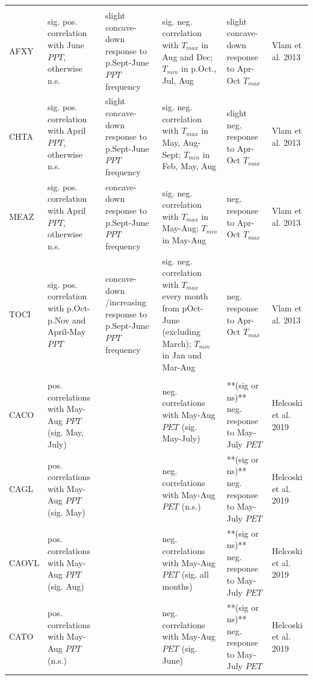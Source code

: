 \documentclass[
]{article}
\begin{document}
\begin{longtable}{l>{\raggedright\arraybackslash}p{2.5cm}>{\raggedright\arraybackslash}p{2.5cm}>{\raggedright\arraybackslash}p{2.5cm}>{\raggedright\arraybackslash}p{2.5cm}>{\raggedright\arraybackslash}p{2cm}}
\addlinespace[1em]
\multicolumn{4}{l}{\textbf{Huai Kha Khaeng, Thailand}}\\
\hspace{1em}AFXY & sig. pos. correlation with June $PPT$, otherwise n.s. & slight concave-down response to p.Sept-June $PPT$ frequency & sig. neg. correlation with $T_{max}$ in Aug and Dec; $T_{min}$ in p.Oct., Jul, Aug & slight concave-down response to Apr-Oct $T_{max}$ & Vlam et al. 2013\\
\hspace{1em}CHTA & sig. pos. correlation with April $PPT$, otherwise n.s. & slight concave-down response to p.Sept-June $PPT$ frequency & sig. neg. correlation with $T_{max}$ in May, Aug-Sept; $T_{min}$ in Feb, May, Aug & slight neg. response to Apr-Oct $T_{max}$ & Vlam et al. 2013\\
\hspace{1em}MEAZ & sig. pos. correlation with April $PPT$, otherwise n.s. & concave-down response to p.Sept-June $PPT$ frequency & sig. neg. correlation with $T_{max}$ in May-Aug; $T_{min}$ in May-Aug & neg. response to Apr-Oct $T_{max}$ & Vlam et al. 2013\\
\hspace{1em}TOCI & sig. pos. correlation with p.Oct-p.Nov and April-May $PPT$ & concave-down /increasing response to p.Sept-June $PPT$ frequency & sig. neg. correlation with $T_{max}$ every month from pOct-June (excluding March); $T_{min}$ in Jan and Mar-Aug & neg. response to Apr-Oct $T_{max}$ & Vlam et al. 2013\\
\addlinespace[1em]
\multicolumn{4}{l}{\textbf{Smithsonian Conservation Biology Institute, Virginia, USA}}\\
\hspace{1em}CACO & pos. correlations with May-Aug $PPT$ (sig. May, July) &  & neg. correlations with May-Aug $PET$ (sig. May-July) & **(sig or ns)** neg. response to May-July $PET$ & Helcoski et al. 2019\\
\hspace{1em}CAGL & pos. correlations with May-Aug $PPT$ (sig. May) &  & neg. correlations with May-Aug $PET$ (n.s.) & **(sig or ns)** neg. response to May-July $PET$ & Helcoski et al. 2019\\
\hspace{1em}CAOVL & pos. correlations with May-Aug $PPT$ (sig. Aug) &  & neg. correlations with May-Aug $PET$ (sig. all months) & **(sig or ns)** neg. response to May-July $PET$ & Helcoski et al. 2019\\
\hspace{1em}CATO & pos. correlations with May-Aug $PPT$ (n.s.) &  & neg. correlations with May-Aug $PET$ (sig. June) & **(sig or ns)** neg. response to May-July $PET$ & Helcoski et al. 2019\\

\end{longtable}
\end{document}
